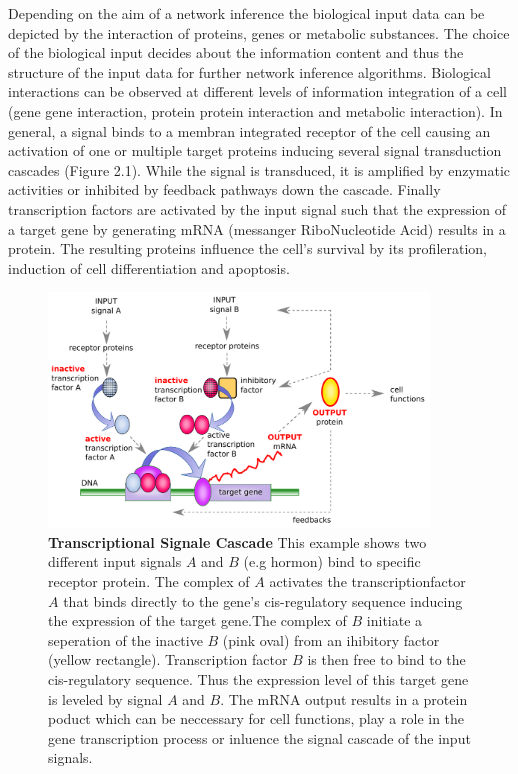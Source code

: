 Depending on the aim of a network inference the biological input data can be depicted by the interaction of proteins, genes or metabolic substances. The choice of the biological input decides about the information content and thus the structure of the input data for further network inference algorithms. Biological interactions can be observed at different levels of information integration of a cell (gene gene interaction, protein protein interaction and metabolic interaction). 
In general, a signal binds to a membran integrated receptor of the cell causing an activation of one or multiple target proteins inducing several signal transduction cascades (Figure 2.1). While the signal is transduced, it is amplified by enzymatic activities or inhibited by feedback pathways down the cascade. Finally transcription factors are activated by the input signal such that the expression of a target gene by generating \gls{mRNA} (messanger RiboNucleotide Acid) results in a protein. The resulting proteins influence the cell's survival by its profileration, induction of cell differentiation and apoptosis.


\begin{figure}[H]
\captionsetup{width=0.9\linewidth}
\centering
\includegraphics[width=0.9\textwidth]{./Bilder/GRN.pdf}
\caption[Transcriptional Signale Cascade]{\textbf{Transcriptional Signale Cascade}
This example shows two different input signals $A$ and $B$ (e.g hormon) bind to specific receptor protein. The complex of $A$ activates the transcriptionfactor $A$ that binds directly to the gene's cis-regulatory sequence inducing the expression of the target gene.The complex of $B$ initiate a seperation of the inactive $B$ (pink oval) from an ihibitory factor (yellow rectangle). Transcription factor $B$ is then free to bind to the cis-regulatory sequence. Thus the expression level of this target gene is leveled by signal $A$ and $B$. The mRNA output results in a protein poduct which can be neccessary for cell functions, play a role in the gene transcription process or inluence the signal cascade of the input signals\citep{GRN}.}
\label{fig:Fig.2.}
\end{figure}


